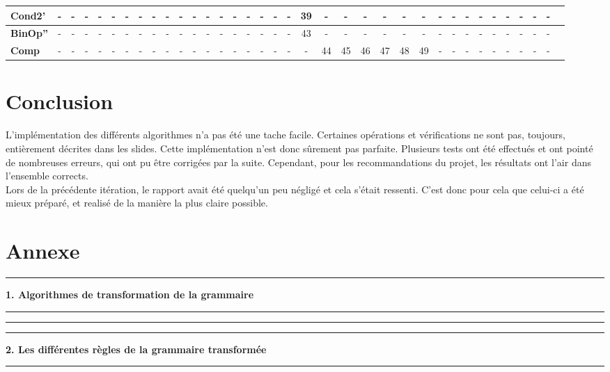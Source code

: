 \documentclass[pdftex,10pt,a4paper]{article}
\begin{document}
\begin{center}
\begin{landscape}
{\begin{tabular}{|l|c|c|c|c|c|c|c|c|c|c|c|c|c|c|c|c|c|c|c|c|c|c|c|c|c|c|c|c|c|c|c|c|c|c|c|}
			 \textbf{Cond2'} &- & - & - & - & - & - & - & - & - & - & - & - & - & - & - & - & - & - & 39 & - & - & - & - & - & - & - & - & - & - & - & - & - & - & - \\ \hline
			 \textbf{BinOp''} &- & - & - & - & - & - & - & - & - & - & - & - & - & - & - & - & - & - & 43 & - & - & - & - & - & - & - & - & - & - & - & - & - & - & - \\ \hline
			 \textbf{Comp} &- & - & - & - & - & - & - & - & - & - & - & - & - & - & - & - & - & - & - & 44 & 45 & 46 & 47 & 48 & 49 & - & - & - & - & - & - & - & - & - \\ \hline
		\end{tabular}
	}
	\end{landscape}
\end{center}

\section{Conclusion}

L'implémentation des différents algorithmes n'a pas été une tache facile. Certaines opérations et vérifications ne sont pas, toujours, entièrement décrites dans les slides. Cette implémentation n'est donc sûrement pas parfaite. Plusieurs tests ont été effectués et ont pointé de nombreuses erreurs, qui ont pu être corrigées par la suite. Cependant, pour les recommandations du projet, les résultats ont l'air dans l'ensemble corrects.\\

Lors de la précédente itération, le rapport avait été quelqu'un peu négligé et cela s'était ressenti. C'est donc pour cela que celui-ci a été mieux préparé, et realisé de la manière la plus claire possible.

\section{Annexe}

\noindent\rule[0.5ex]{\linewidth}{1pt}
\textbf{1. Algorithmes de transformation de la grammaire}\\
\noindent\rule[0.5ex]{\linewidth}{1pt}





\noindent\rule[0.5ex]{\linewidth}{1pt}


\noindent\rule[0.5ex]{\linewidth}{1pt}
\textbf{2. Les différentes règles de la grammaire transformée}\\
\noindent\rule[0.5ex]{\linewidth}{1pt}
\end{document}
